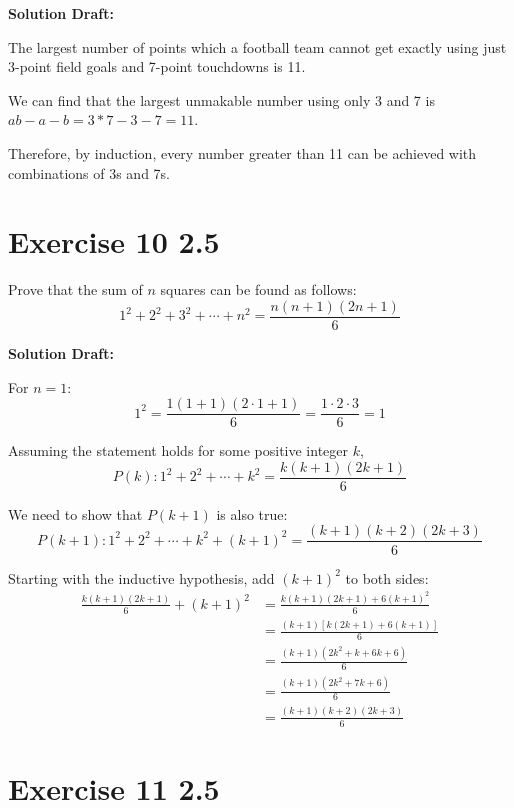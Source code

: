 \documentclass{article}
\begin{document}
\vspace{0.5cm}
\noindent\textbf{Solution Draft:} 
\vspace{0.2cm}

The largest number of points which a football team cannot get exactly using just 3-point field goals and 7-point touchdowns is 11. 

We can find that the largest unmakable number using only 3 and 7 is $ab-a-b=3*7-3-7=11$.

Therefore, by induction, every number greater than 11 can be achieved with combinations of 3s and 7s.

\section*{Exercise 10 2.5}  

Prove that the sum of \( n \) squares can be found as follows:
\[ 1^2 + 2^2 + 3^2 + \cdots + n^2 = \frac{n(n + 1)(2n + 1)}{6} \]

\vspace{0.5cm}
\noindent\textbf{Solution Draft:} 
\vspace{0.2cm}

For \( n = 1 \):
\[ 1^2 = \frac{1(1 + 1)(2 \cdot 1 + 1)}{6} = \frac{1 \cdot 2 \cdot 3}{6} = 1 \]

Assuming the statement holds for some positive integer \( k \),
\[ P(k): 1^2 + 2^2 + \cdots + k^2 = \frac{k(k + 1)(2k + 1)}{6} \]

We need to show that \( P(k + 1) \) is also true:
\[ P(k + 1): 1^2 + 2^2 + \cdots + k^2 + (k + 1)^2 = \frac{(k + 1)(k + 2)(2k + 3)}{6} \]

Starting with the inductive hypothesis, add \( (k + 1)^2 \) to both sides:
\begin{align*}
\frac{k(k + 1)(2k + 1)}{6} + (k + 1)^2 &= \frac{k(k + 1)(2k + 1) + 6(k + 1)^2}{6} \\
&= \frac{(k + 1)[k(2k + 1) + 6(k + 1)]}{6} \\
&= \frac{(k + 1)(2k^2 + k + 6k + 6)}{6} \\
&= \frac{(k + 1)(2k^2 + 7k + 6)}{6} \\
&= \frac{(k + 1)(k + 2)(2k + 3)}{6}
\end{align*}

\section*{Exercise 11 2.5}  
\end{document}
